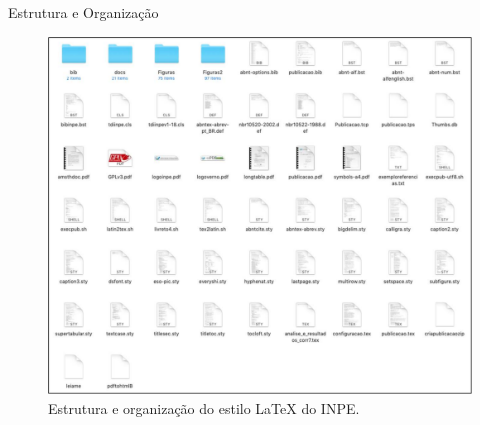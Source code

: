 \documentclass[10pt]{beamer}
\begin{document}
\begin{frame}{Estrutura e Organização}
\begin{figure}[H]
    \vspace{1em}
    \begin{center}
        \includegraphics[scale=0.17]{./figs/estrutura_estilo_inpe.pdf}
    \end{center}
\caption{Estrutura e organização do estilo \LaTeX{} do INPE.}
\end{figure}
\end{frame}
\end{document}
